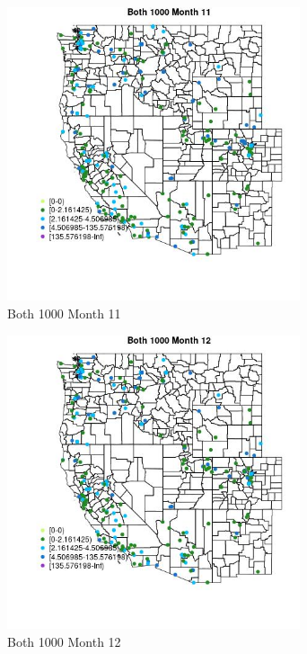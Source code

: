 \begin{figure} 
\centering  
\includegraphics[width=0.77\textwidth]{Code_Outputs/Report_ML_input_PM25_Step4_part_e_de_duplicated_aveswNAs_MapObsMo11Both_1000.jpg} 
\caption{\label{fig:Report_ML_input_PM25_Step4_part_e_de_duplicated_aveswNAsMapObsMo11Both_1000}Both 1000 Month 11} 
\end{figure} 
 

\begin{figure} 
\centering  
\includegraphics[width=0.77\textwidth]{Code_Outputs/Report_ML_input_PM25_Step4_part_e_de_duplicated_aveswNAs_MapObsMo12Both_1000.jpg} 
\caption{\label{fig:Report_ML_input_PM25_Step4_part_e_de_duplicated_aveswNAsMapObsMo12Both_1000}Both 1000 Month 12} 
\end{figure} 
 

